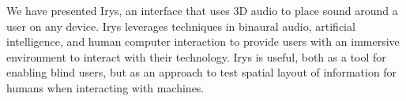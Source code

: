We have presented Irys, an interface that uses 3D audio to place sound around a
user on any device. Irys leverages techniques in binaural audio, artificial
intelligence, and human computer interaction to provide users with an immersive
environment to interact with their technology. Irys is useful, both as a tool
for enabling blind users, but as an approach to test spatial layout of
information for humans when interacting with machines.


\newpage                                                  {}

